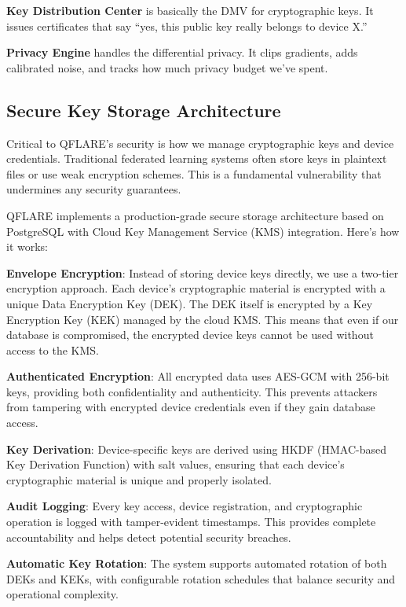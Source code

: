\documentclass[onecolumn,11pt]{article}
\begin{document}
\textbf{Key Distribution Center} is basically the DMV for cryptographic keys. It issues certificates that say ``yes, this public key really belongs to device X.''

\textbf{Privacy Engine} handles the differential privacy. It clips gradients, adds calibrated noise, and tracks how much privacy budget we've spent.

\subsection{Secure Key Storage Architecture}

Critical to QFLARE's security is how we manage cryptographic keys and device credentials. Traditional federated learning systems often store keys in plaintext files or use weak encryption schemes. This is a fundamental vulnerability that undermines any security guarantees.

QFLARE implements a production-grade secure storage architecture based on PostgreSQL with Cloud Key Management Service (KMS) integration. Here's how it works:

\textbf{Envelope Encryption}: Instead of storing device keys directly, we use a two-tier encryption approach. Each device's cryptographic material is encrypted with a unique Data Encryption Key (DEK). The DEK itself is encrypted by a Key Encryption Key (KEK) managed by the cloud KMS. This means that even if our database is compromised, the encrypted device keys cannot be used without access to the KMS.

\textbf{Authenticated Encryption}: All encrypted data uses AES-GCM with 256-bit keys, providing both confidentiality and authenticity. This prevents attackers from tampering with encrypted device credentials even if they gain database access.

\textbf{Key Derivation}: Device-specific keys are derived using HKDF (HMAC-based Key Derivation Function) with salt values, ensuring that each device's cryptographic material is unique and properly isolated.

\textbf{Audit Logging}: Every key access, device registration, and cryptographic operation is logged with tamper-evident timestamps. This provides complete accountability and helps detect potential security breaches.

\textbf{Automatic Key Rotation}: The system supports automated rotation of both DEKs and KEKs, with configurable rotation schedules that balance security and operational complexity.
\end{document}
